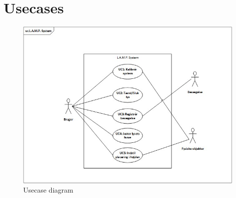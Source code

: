 \section{Usecases}

\begin{figure}[H] \centering
    \includegraphics[width=\textwidth]{0_Filer/Figuer/ucLAMP3.jpg}
    \caption{Usecase diagram}
    \label{fig:usecasediagram}
\end{figure}











%

%

%

%